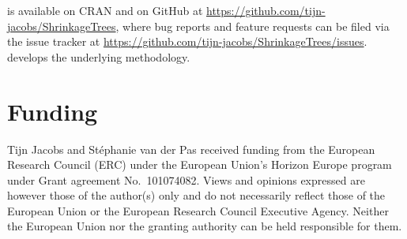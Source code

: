  is available on CRAN and on GitHub at \url{https://github.com/tijn-jacobs/ShrinkageTrees}, where bug reports and feature requests can be filed via the issue tracker at \url{https://github.com/tijn-jacobs/ShrinkageTrees/issues}. \citet{jacobs2025horseshoe} develops the underlying methodology.

\section{Funding}\label{funding}

Tijn Jacobs and Stéphanie van der Pas received funding from the European Research Council (ERC) under the European Union's Horizon Europe program under Grant agreement No.~101074082. Views and opinions expressed are however those of the author(s) only and do not necessarily reflect those of the European Union or the European Research Council Executive Agency. Neither the European Union nor the granting authority can be held responsible for them.



\address{%
Tijn Jacobs\\
Vrije Universiteit Amsterdam\\%
Department of Mathematics\\ Amsterdam, The Netherlands\\
%
\url{https://tijn-jacobs.github.io/}\\%
\textit{ORCiD: \href{https://orcid.org/0009-0003-6188-9296}{0009-0003-6188-9296}}\\%
\href{mailto:t.jacobs@vu.nl}{\nolinkurl{t.jacobs@vu.nl}}%
}

\address{%
Stéphanie van der Pas\\
Vrije Universiteit Amsterdam\\%
Department of Mathematics\\ Amsterdam, The Netherlands\\
%
\url{https://www.stephanievanderpas.nl/}\\%
\textit{ORCiD: \href{https://orcid.org/0000-0002-2448-5378}{0000-0002-2448-5378}}\\%
\href{mailto:s.l.vander.pas@vu.nl}{\nolinkurl{s.l.vander.pas@vu.nl}}%
}

\address{%
Wessel van Wieringen\\
Vrije Universiteit Amsterdam\textbackslash{} Amsterdam University Medical Centre\\%
Department of Mathematics, Amsterdam, The Netherlands\\ Epidemiology and Data Science, Amsterdam, The Netherlands\\
%
\url{https://www.math.vu.nl/~wvanwie/}\\%
\textit{ORCiD: \href{https://orcid.org/0000-0002-5100-9123}{0000-0002-5100-9123}}\\%
\href{mailto:w.n.vanwieringen@vu.nl}{\nolinkurl{w.n.vanwieringen@vu.nl}}%
}
